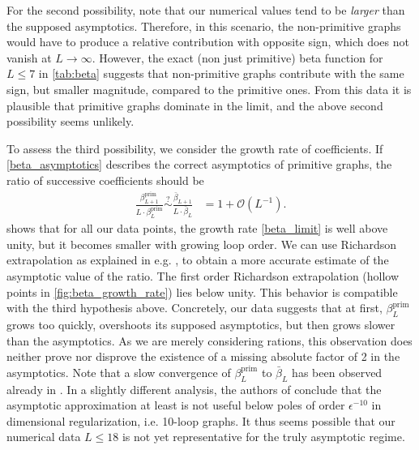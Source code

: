 \documentclass[12pt,a4paper]{article}
\renewcommand{\|}{\rule[-0.4ex]{0.2ex}{1.2em}}
\begin{document}
For the second possibility,   note that   our numerical values tend to be \emph{larger} than the supposed asymptotics. Therefore, in this scenario, the non-primitive graphs would have to produce a relative contribution with opposite sign, which does not vanish at $L \rightarrow\infty$. However,    the exact (non just primitive) beta function for $L\leq 7$ in \cref{tab:beta} suggests that non-primitive graphs contribute with the same sign, but smaller magnitude, compared to the primitive ones. From this data it is plausible that primitive graphs dominate in the limit, and the above second possibility  seems unlikely.


To assess the third possibility, we consider the growth rate of coefficients.
If \cref{beta_asymptotics} describes the correct asymptotics of primitive graphs,   the ratio of successive coefficients should be
\begin{align}\label{beta_limit}
	\frac{\beta^\text{prim}_{L+1}}{L\cdot \beta^\text{prim}_L} \overset{?}{\sim }  \frac{\bar \beta_{L+1}}{L \cdot \bar \beta_L}&=1 + \mathcal{O} \left( L^{-1} \right) .
\end{align}
 shows that for all our data points, the growth rate \cref{beta_limit} is well above unity, but it becomes smaller with growing loop order. We can use Richardson extrapolation \cite{richardson_approximate_1911} as explained in e.g. \cite{aniceto_primer_2019}, to obtain a more accurate estimate of the asymptotic value of the ratio. The first order Richardson extrapolation (hollow points in \cref{fig:beta_growth_rate}) lies below unity.  This behavior is compatible with the third hypothesis above. Concretely, our data suggests that at first, $\beta^\text{prim}_L$ grows too quickly, overshoots its supposed asymptotics, but then grows slower than the asymptotics. As we are merely considering rations, this observation does neither prove nor disprove the existence of a missing absolute factor of 2 in the asymptotics. Note that a slow convergence of $\beta^\text{prim}_L$ to $\bar \beta_L$ has been observed already in \cite{kompaniets_minimally_2017}. 
In a slightly different analysis, the authors of \cite{komarova_asymptotic_2001} conclude that the asymptotic  approximation at least is not useful below poles of order $\epsilon^{-10}$ in dimensional regularization, i.e. 10-loop graphs. It thus seems possible that our numerical data $L \leq 18$ is not yet representative for the truly asymptotic regime. 
\end{document}
